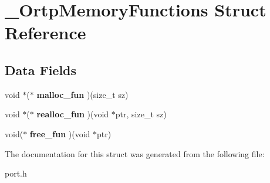 \section{\+\_\+\+Ortp\+Memory\+Functions Struct Reference}
\label{struct__OrtpMemoryFunctions}
\subsection*{Data Fields}
\begin{DoxyCompactItemize}
\item 
\mbox{\label{struct__OrtpMemoryFunctions_af4886c5137a02d86679f2c0581cf8247}} 
void $\ast$($\ast$ {\bfseries malloc\+\_\+fun} )(size\+\_\+t sz)
\item 
\mbox{\label{struct__OrtpMemoryFunctions_a664f939d6be1c4d25f2dad1b48e9cc52}} 
void $\ast$($\ast$ {\bfseries realloc\+\_\+fun} )(void $\ast$ptr, size\+\_\+t sz)
\item 
\mbox{\label{struct__OrtpMemoryFunctions_a0188e2a69f5385fb7ef28c05472a65d1}} 
void($\ast$ {\bfseries free\+\_\+fun} )(void $\ast$ptr)
\end{DoxyCompactItemize}


The documentation for this struct was generated from the following file\+:\begin{DoxyCompactItemize}
\item 
port.\+h\end{DoxyCompactItemize}

